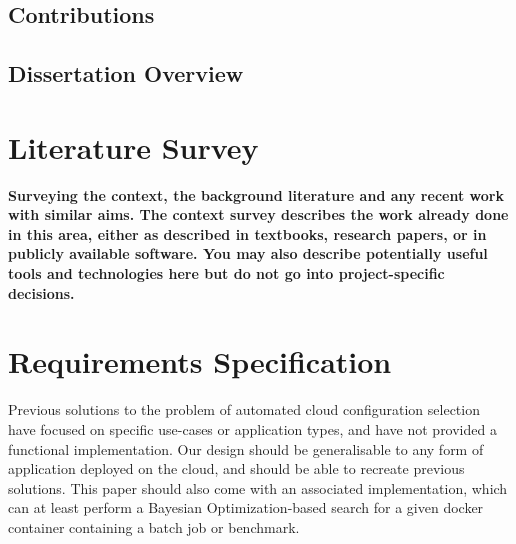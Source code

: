 \documentclass{article}
\begin{document}
\subsection{Contributions}

\subsection{Dissertation Overview}


\section{Literature Survey}
\textbf{Surveying the context, the background literature and any
recent work with similar aims. The context survey
describes the work already done in this area, either as
described in textbooks, research papers, or in publicly
available software. You may also describe potentially
useful tools and technologies here but do not go into
project-specific decisions.}




\section{Requirements Specification}
Previous solutions to the problem of automated cloud configuration selection have focused on specific use-cases or application types, and have not provided a functional implementation.  Our design should be generalisable to any form of application deployed on the cloud, and should be able to recreate previous solutions. This paper should also come with an associated implementation, which can at least perform a Bayesian Optimization-based search for a given docker container containing a batch job or benchmark.
\end{document}
